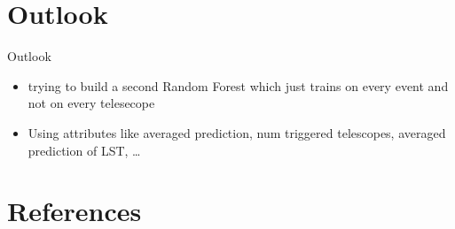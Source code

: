 \documentclass[aspectratio=1610, professionalfonts, 9pt]{beamer}
\begin{document}
\section{Outlook}
  \begin{frame}{Outlook}
    \begin{itemize}
      \item trying to build a second Random Forest which just trains on every event and not on every telesecope
      \item Using attributes like averaged prediction, num triggered telescopes, averaged prediction of LST, \dots
    \end{itemize}
  \end{frame}
\section{References}
  \printbibliography
\end{document}

